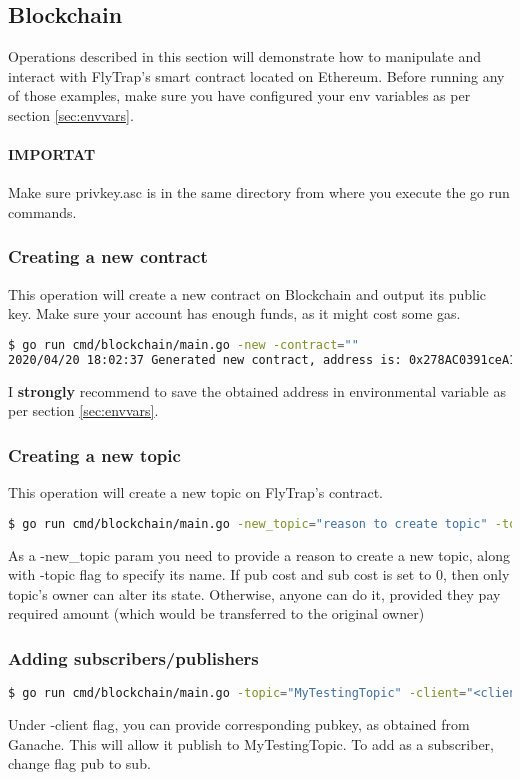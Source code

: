 \subsection{Blockchain}
Operations described in this section will demonstrate how to manipulate and interact with FlyTrap's smart contract located on Ethereum. Before running any of those examples, make sure you have configured your env variables as per section \ref{sec:envvars}.

\paragraph{IMPORTAT} Make sure privkey.asc is in the same directory from where you execute the go run commands.
\subsubsection{Creating a new contract}
This operation will create a new contract on Blockchain and output its public key. Make sure your account has enough funds, as it might cost some gas.
\begin{lstlisting}[language=bash,breaklines=true]
$ go run cmd/blockchain/main.go -new -contract=""
2020/04/20 18:02:37 Generated new contract, address is: 0x278AC0391ceA1E7664D4242C7398FCDe79539a93
\end{lstlisting}
I \textbf{strongly} recommend to save the obtained address in environmental variable as per section \ref{sec:envvars}.
\subsubsection{Creating a new topic}
This operation will create a new topic on FlyTrap's contract.
\begin{lstlisting}[language=bash,breaklines=true]
$ go run cmd/blockchain/main.go -new_topic="reason to create topic" -topic="MyTestingTopic" -pub_cost=0 -sub_cost=0
\end{lstlisting}
As a -new\_topic param you need to provide a reason to create a new topic, along with -topic flag to specify its name. If pub cost and sub cost is set to 0, then only topic's owner can alter its state. Otherwise, anyone can do it, provided they pay required amount (which would be transferred to the original owner)
\subsubsection{Adding subscribers/publishers}
\begin{lstlisting}[language=bash,breaklines=true]
$ go run cmd/blockchain/main.go -topic="MyTestingTopic" -client="<client_pubkey>" -pub="Addining a new publisher"
\end{lstlisting}
Under -client flag, you can provide corresponding pubkey, as obtained from Ganache. This will allow it publish to MyTestingTopic. To add as a subscriber, change flag pub to sub.
